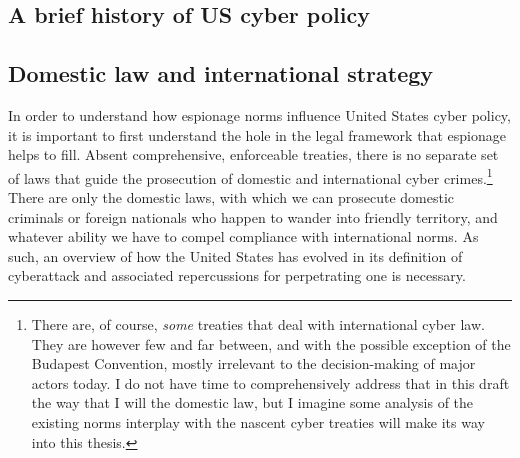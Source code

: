 \documentclass{memoir}
\begin{document}
\begin{refsegment}





\section{A brief history of US cyber policy}
\subsection{Domestic law and international strategy}
In order to understand how espionage norms influence United States cyber policy, it is important to first understand the hole in the legal framework that espionage helps to fill. Absent comprehensive, enforceable treaties, there is no separate set of laws that guide the prosecution of domestic and international cyber crimes.\footnote{There are, of course, \emph{some} treaties that deal with international cyber law. They are however few and far between, and with the possible exception of the Budapest Convention, mostly irrelevant to the decision-making of major actors today. I do not have time to comprehensively address that in this draft the way that I will the domestic law, but I imagine some analysis of the existing norms interplay with the nascent cyber treaties will make its way into this thesis.} There are only the domestic laws, with which we can prosecute domestic criminals or foreign nationals who happen to wander into friendly territory, and whatever ability we have to compel compliance with international norms. As such, an overview of how the United States has evolved in its definition of cyberattack and associated repercussions for perpetrating one is necessary.


\end{refsegment}
\end{document}
